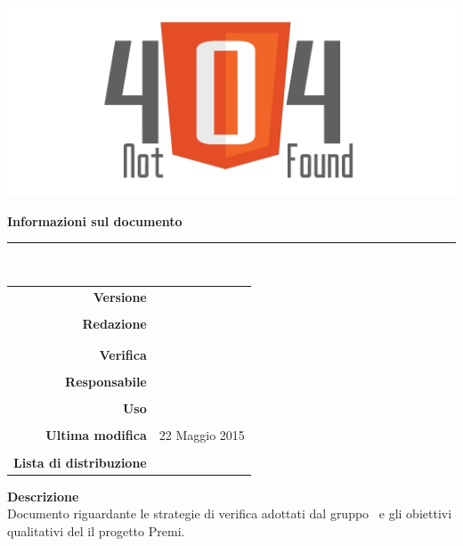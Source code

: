 \thispagestyle{empty}

\begin{titlepage}
	\begin{center}
	\begin{Huge}
		\textbf{\gruppo} \\
	\end{Huge}
	\vspace{0.5cm}
	\begin{Large}
		\textbf{\capitolato}
	\end{Large}
	
	\vspace{1cm}
    
	\includegraphics[scale=0.35]{../logo/logo404_Extends.png}
	\vspace{1cm}
	\begin{Huge}
		\textbf{\titDoc}
	\end{Huge}
	
	\vspace{1cm}
	\textbf{Informazioni sul documento}\\
    \rule{10cm}{.4pt} \\
	\begin{table}[h]
	\begin{center}
	\begin{tabular}{r | l}
		\textbf{Versione} & \versione \\ \\
		\textbf{Redazione} & \DeEn \\
			& \VeFe \\ \\
		\textbf{Verifica} &\CaMa \\ \\
		\textbf{Responsabile} & \GoIs\\ \\
		\textbf{Uso} & \uso \\ \\
		\textbf{Ultima modifica} & 22 Maggio 2015 \\ \\
		\textbf{Lista di distribuzione} & \gruppo \\ 
	\end{tabular}
	\end{center}
	\end{table}
			\textbf{Descrizione} \\
            Documento riguardante le strategie di verifica adottati dal gruppo \gruppo\ e gli obiettivi qualitativi
            del il progetto Premi.
	\end{center}
\end{titlepage}